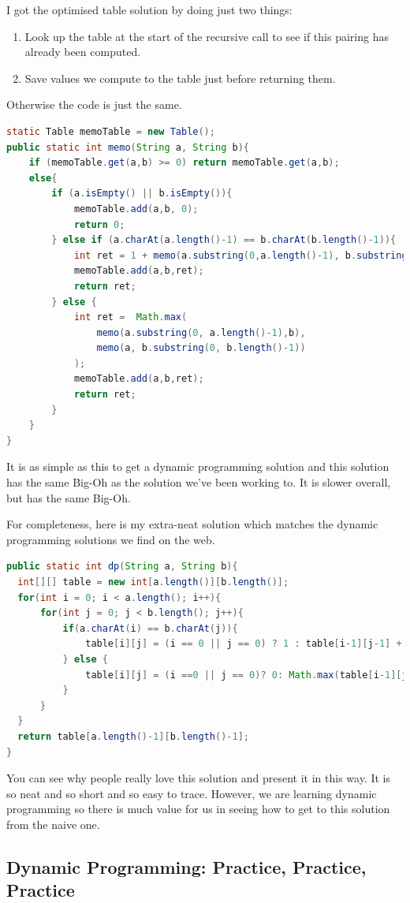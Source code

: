 \documentclass[twoside=false,DIV=14]{scrartcl}
\begin{document}
I got the optimised table solution by doing just two things:
\begin{enumerate}
\item Look up the table at the start of the recursive call to see if this pairing has already been computed.
\item Save values we compute to the table just before returning them.
\end{enumerate}
Otherwise the code is just the same.
\begin{lstlisting}[language=java]
static Table memoTable = new Table();
public static int memo(String a, String b){
    if (memoTable.get(a,b) >= 0) return memoTable.get(a,b);
    else{
        if (a.isEmpty() || b.isEmpty()){
            memoTable.add(a,b, 0);
            return 0;
        } else if (a.charAt(a.length()-1) == b.charAt(b.length()-1)){
            int ret = 1 + memo(a.substring(0,a.length()-1), b.substring(0,b.length()-1));
            memoTable.add(a,b,ret);
            return ret;
        } else {
            int ret =  Math.max(
                memo(a.substring(0, a.length()-1),b),
                memo(a, b.substring(0, b.length()-1))
            );
            memoTable.add(a,b,ret);
            return ret;
        }
    }
} 
\end{lstlisting}
It is as simple as this to get a dynamic programming solution and this solution has the same Big-Oh as the solution we've been working to.  It is slower overall, but has the same Big-Oh.

For completeness, here is my extra-neat solution which matches the dynamic programming solutions we find on the web.
\begin{lstlisting}[language=java]
public static int dp(String a, String b){
  int[][] table = new int[a.length()][b.length()];
  for(int i = 0; i < a.length(); i++){
      for(int j = 0; j < b.length(); j++){
          if(a.charAt(i) == b.charAt(j)){
              table[i][j] = (i == 0 || j == 0) ? 1 : table[i-1][j-1] + 1;
          } else {
              table[i][j] = (i ==0 || j == 0)? 0: Math.max(table[i-1][j], table[i][j-1]);
          }
      }
  }
  return table[a.length()-1][b.length()-1];
} 
\end{lstlisting}
You can see why people really love this solution and present it in this way. It is so neat and so short and so easy to trace.  However, we are learning dynamic programming so there is much value for us in seeing how to get to this solution from the naive one.

\subsection{Dynamic Programming: Practice, Practice, Practice}
\end{document}
